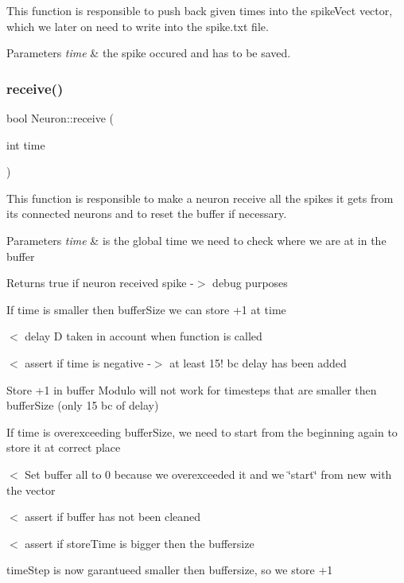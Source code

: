 This function is responsible to push back given times into the spike\+Vect vector, which we later on need to write into the spike.\+txt file. 
\begin{DoxyParams}{Parameters}
{\em time} & the spike occured and has to be saved. \\
\hline
\end{DoxyParams}
\mbox{\label{class_neuron_a6cc00373ace5406d18a4673a82ba0e09}} 
\subsubsection{receive()}
{\footnotesize\ttfamily bool Neuron\+::receive (\begin{DoxyParamCaption}\item[{int}]{time }\end{DoxyParamCaption})}

This function is responsible to make a neuron receive all the spikes it gets from its connected neurons and to reset the buffer if necessary. 
\begin{DoxyParams}{Parameters}
{\em time} & is the global time we need to check where we are at in the buffer \\
\hline
\end{DoxyParams}
\begin{DoxyReturn}{Returns}
true if neuron received spike -\/$>$ debug purposes 
\end{DoxyReturn}
If time is smaller then buffer\+Size we can store +1 at time

$<$ delay D taken in account when function is called

$<$ assert if time is negative -\/$>$ at least 15! bc delay has been added

Store +1 in buffer Modulo will not work for timesteps that are smaller then buffer\+Size (only 15 bc of delay)

If time is overexceeding buffer\+Size, we need to start from the beginning again to store it at correct place

$<$ Set buffer all to 0 because we overexceeded it and we \char`\"{}start\char`\"{} from new with the vector

$<$ assert if buffer has not been cleaned

$<$ assert if store\+Time is bigger then the buffersize

time\+Step is now garantueed smaller then buffersize, so we store +1 \mbox{\label{class_neuron_a95efbf8af058ce38307abc4c229ed046}} 
